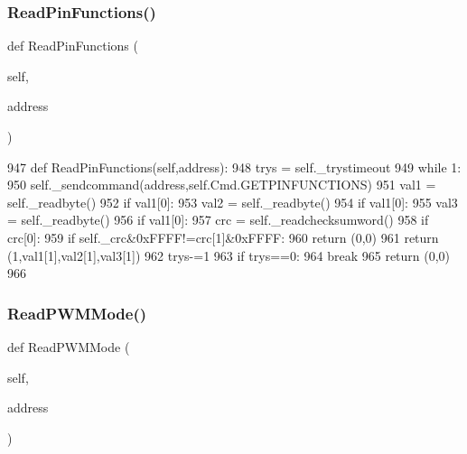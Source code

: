 \subsubsection{\texorpdfstring{Read\+Pin\+Functions()}{ReadPinFunctions()}}
{\footnotesize\ttfamily def Read\+Pin\+Functions (\begin{DoxyParamCaption}\item[{}]{self,  }\item[{}]{address }\end{DoxyParamCaption})}


\begin{DoxyCode}
947     \textcolor{keyword}{def }ReadPinFunctions(self,address):
948         trys = self.\_trystimeout
949         \textcolor{keywordflow}{while} 1:
950             self.\_sendcommand(address,self.Cmd.GETPINFUNCTIONS)
951             val1 = self.\_readbyte()
952             \textcolor{keywordflow}{if} val1[0]:
953                 val2 = self.\_readbyte()
954                 \textcolor{keywordflow}{if} val1[0]:
955                     val3 = self.\_readbyte()
956                     \textcolor{keywordflow}{if} val1[0]:
957                         crc = self.\_readchecksumword()
958                         \textcolor{keywordflow}{if} crc[0]:
959                             \textcolor{keywordflow}{if} self.\_crc&0xFFFF!=crc[1]&0xFFFF:
960                                 \textcolor{keywordflow}{return} (0,0)
961                             \textcolor{keywordflow}{return} (1,val1[1],val2[1],val3[1])
962             trys-=1
963             \textcolor{keywordflow}{if} trys==0:
964                 \textcolor{keywordflow}{break}
965         \textcolor{keywordflow}{return} (0,0)
966 
\end{DoxyCode}
\mbox{\label{classtoxic__hardware_1_1roboclaw__3_1_1Roboclaw_a3d8822116c10f298f220bcf6bff9ef82}} 
\subsubsection{\texorpdfstring{Read\+P\+W\+M\+Mode()}{ReadPWMMode()}}
{\footnotesize\ttfamily def Read\+P\+W\+M\+Mode (\begin{DoxyParamCaption}\item[{}]{self,  }\item[{}]{address }\end{DoxyParamCaption})}


